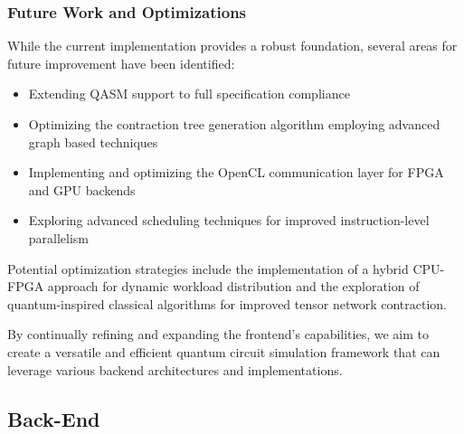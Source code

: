 \documentclass[12pt,oneside,a4paper]{article}
\begin{document}
\subsubsection{Future Work and Optimizations}

While the current implementation provides a robust foundation, several areas for future improvement have been identified:

\begin{itemize}
    \item Extending QASM support to full specification compliance
    \item Optimizing the contraction tree generation algorithm employing advanced graph based techniques \cite{PhysRevE.90.033315}
    \item Implementing and optimizing the OpenCL communication layer for FPGA and GPU backends
    \item Exploring advanced scheduling techniques for improved instruction-level parallelism
\end{itemize}

Potential optimization strategies include the implementation of a hybrid CPU-FPGA approach for dynamic workload distribution and the exploration of quantum-inspired classical algorithms for improved tensor network contraction.

By continually refining and expanding the frontend's capabilities, we aim to create a versatile and efficient quantum circuit simulation framework that can leverage various backend architectures and implementations.


\subsection{Back-End}


\end{document}
